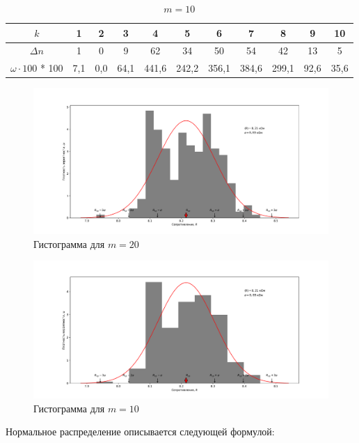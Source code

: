 \documentclass[a4paper,12pt]{article} %
\begin{document}
\begin{table}[]
	\begin{tabular}{|c|c|c|c|c|c|c|c|c|c|c|}
		\hline
		$ k $           & 1   & 2   & 3    & 4     & 5     & 6     & 7     & 8     & 9    & 10   \\ \hline
		$ \Delta n $           & 1   & 0   & 9    & 62    & 34    & 50    & 54    & 42    & 13   & 5    \\ \hline
		$ \omega \cdot 100 $ * 100 & 7,1 & 0,0 & 64,1 & 441,6 & 242,2 & 356,1 & 384,6 & 299,1 & 92,6 & 35,6 \\ \hline
	\end{tabular} \caption{$ m = 10 $}\label{m10}
\end{table}


\begin{figure}


			\includegraphics[width=1.1\linewidth]{m=20.pdf}
\caption{Гистограмма для $ m = 20 $}\label{gist20}

\end{figure}

\begin{figure}
	
	
	\includegraphics[width=1.08\linewidth]{m=10.pdf}
	\caption{Гистограмма для $ m = 10 $}\label{gist10}
	
\end{figure}
\newpage
Нормальное распределение описывается следующей формулой:
\end{document}
